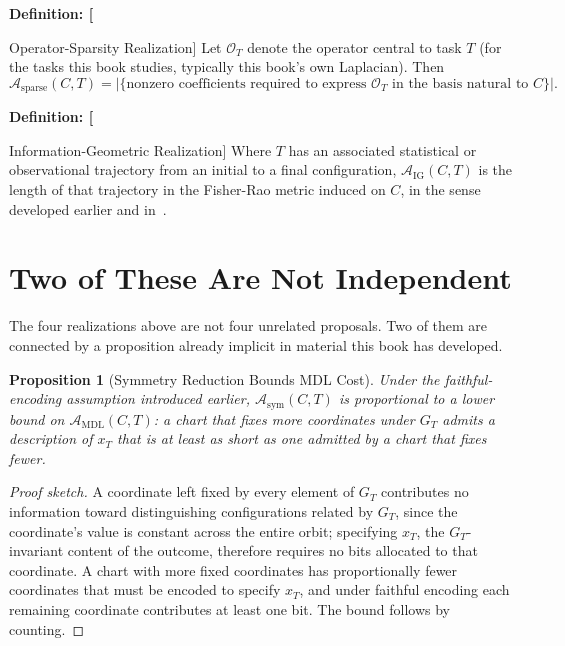 \documentclass[11pt,fleqn]{book}
\numberwithin{equation}{chapter}
\newenvironment{definition}[1]
  {\begin{definitionEnv}
   \noindent\textbf{Definition: #1}\par\smallskip}
  {\end{definitionEnv}}
\theoremstyle{plain}
\newtheorem{proposition}[theorem]{Proposition}
\theoremstyle{definition}
\theoremstyle{remark}
\begin{document}
\begin{definition}[Operator-Sparsity Realization]
Let \(\mathcal O_T\) denote the operator central to task \(T\) (for the tasks this book studies, typically this book's own Laplacian). Then
\[
\mathcal A_{\mathrm{sparse}}(C,T) = \bigl|\{\text{nonzero coefficients required to express } \mathcal O_T \text{ in the basis natural to } C\}\bigr|.
\]
\end{definition}

\begin{definition}[Information-Geometric Realization]
Where \(T\) has an associated statistical or observational trajectory from an initial to a final configuration, \(\mathcal A_{\mathrm{IG}}(C,T)\) is the length of that trajectory in the Fisher-Rao metric induced on \(C\), in the sense developed earlier and in~\cite{amari2000}.
\end{definition}

\section{Two of These Are Not Independent}

The four realizations above are not four unrelated proposals. Two of them are connected by a proposition already implicit in material this book has developed.

\begin{proposition}[Symmetry Reduction Bounds MDL Cost]
Under the faithful-encoding assumption introduced earlier, \(\mathcal A_{\mathrm{sym}}(C,T)\) is proportional to a lower bound on \(\mathcal A_{\mathrm{MDL}}(C,T)\): a chart that fixes more coordinates under \(G_T\) admits a description of \(x_T\) that is at least as short as one admitted by a chart that fixes fewer.
\end{proposition}

\begin{proof}[Proof sketch]
A coordinate left fixed by every element of \(G_T\) contributes no information toward distinguishing configurations related by \(G_T\), since the coordinate's value is constant across the entire orbit; specifying \(x_T\), the \(G_T\)-invariant content of the outcome, therefore requires no bits allocated to that coordinate. A chart with more fixed coordinates has proportionally fewer coordinates that must be encoded to specify \(x_T\), and under faithful encoding each remaining coordinate contributes at least one bit. The bound follows by counting.
\end{proof}
\end{document}
